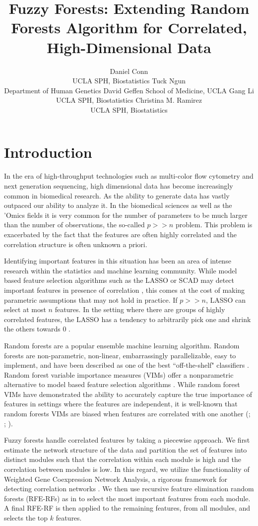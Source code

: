 \documentclass[article,shortnames]{jss}
\author{Daniel Conn\\ UCLA SPH, Biostatistics \AND Tuck Ngun\\Department of Human Genetics David Geffen School of Medicine, UCLA \AND  Gang Li\\UCLA SPH, Biostatistics \And Christina M. Ramirez\\UCLA SPH, Biostatistics}
\title{Fuzzy Forests: Extending Random Forests Algorithm for Correlated, High-Dimensional Data}
\begin{document}

\section{Introduction}
In the era of high-throughput technologies such as multi-color flow cytometry and next generation sequencing, high dimensional data has become 
increasingly common in biomedical research.  As the ability to generate data has vastly outpaced our ability to analyze it.  In the biomedical
sciences as well as the 'Omics fields it is very common for the number of parameters to be much larger than the number of observations,
the so-called $p >> n$ problem.  This problem is exacerbated by the fact that the features are often highly correlated and the correlation
structure is often unknown a priori.

Identifying important features in this situation has been an area of intense research within the statistics
and machine learning community.  While model based feature selection algorithms such as the LASSO
 or SCAD may detect important features in presence of correlation \citep{raskutti2010restricted}, this comes 
 at the cost of making parametric assumptions that may not hold in practice.  If $p >> n$, LASSO can select
 at most $n$ features.  In the setting where there are groups of highly correlated features, the LASSO has a 
 tendency to arbitrarily pick one and shrink the others towards 0 \citep{bondell2008simultaneous}.
 
Random forests are a popular ensemble machine learning algorithm.  Random forests are non-parametric, non-linear, embarrassingly parallelizable, easy to implement, and have been described as one of the best ``off-the-shelf" classifiers \citep{dua2014machine}.
Random forest variable importance measures (VIMs) offer a nonparametric alternative to model based feature selection algorithms \citep{breiman2001random}.
While random forest VIMs have demonstrated the ability to accurately capture the true 
importance of features in settings where the features are independent, it is well-known that random forests VIMs are biased when features are correlated
with one another (\citep{strobl2007bias}; \citep{strobl2008conditional}; \citep{nicodemus2009predictor}).

Fuzzy forests handle correlated features by taking a piecewise approach.  We first estimate the network structure of the data and partition the set of features into distinct modules such that the correlation within each module is high and the correlation between modules is low.  In this regard, we utilize the functionality of Weighted Gene Coexpression Network Analysis, a rigorous framework for detecting correlation networks \citep{zhang2005general}.  We then use recursive feature elimination random forests (RFE-RFs) as in \citep{diaz2006gene} to select the most important features from each module.  A final RFE-RF is then applied to the remaining features, from all modules, and selects the top $k$ features. 
       
\end{document}
